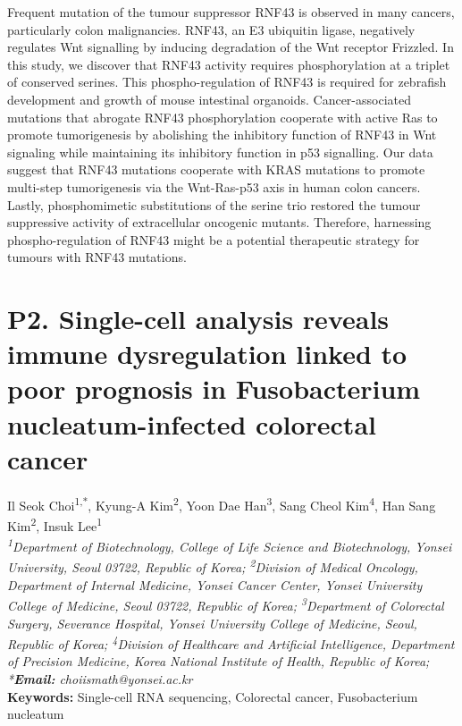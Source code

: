 \noindent
Frequent mutation of the tumour suppressor RNF43 is observed in many cancers, particularly colon malignancies. RNF43, an E3 ubiquitin ligase, negatively regulates Wnt signalling by inducing degradation of the Wnt receptor Frizzled. In this study, we discover that RNF43 activity requires phosphorylation at a triplet of conserved serines. This phospho-regulation of RNF43 is required for zebrafish development and growth of mouse intestinal organoids. Cancer-associated mutations that abrogate RNF43 phosphorylation cooperate with active Ras to promote tumorigenesis by abolishing the inhibitory function of RNF43 in Wnt signaling while maintaining its inhibitory function in p53 signalling. Our data suggest that RNF43 mutations cooperate with KRAS mutations to promote multi-step tumorigenesis via the Wnt-Ras-p53 axis in human colon cancers. Lastly, phosphomimetic substitutions of the serine trio restored the tumour suppressive activity of extracellular oncogenic mutants. Therefore, harnessing phospho-regulation of RNF43 might be a potential therapeutic strategy for tumours with RNF43 mutations.
\newpage

\section*{P2. Single-cell analysis reveals immune dysregulation linked to poor prognosis in Fusobacterium nucleatum-infected colorectal cancer}

\begin{center}
Il Seok Choi\textsuperscript{1,*}, Kyung-A Kim\textsuperscript{2}, Yoon Dae Han\textsuperscript{3}, Sang Cheol Kim\textsuperscript{4}, Han Sang Kim\textsuperscript{2}, Insuk Lee\textsuperscript{1} \\
\vspace{0.3cm}
\textit{\textsuperscript{1}Department of Biotechnology, College of Life Science and Biotechnology, Yonsei University, Seoul 03722, Republic of Korea; \textsuperscript{2}Division of Medical Oncology, Department of Internal Medicine, Yonsei Cancer Center, Yonsei University College of Medicine, Seoul 03722, Republic of Korea; \textsuperscript{3}Department of Colorectal Surgery, Severance Hospital, Yonsei University College of Medicine, Seoul, Republic of Korea; \textsuperscript{4}Division of Healthcare and Artificial Intelligence, Department of Precision Medicine, Korea National Institute of Health, Republic of Korea; *\textbf{Email:} choiismath@yonsei.ac.kr} \\
\vspace{0.3cm}
\textbf{Keywords:} Single-cell RNA sequencing, Colorectal cancer, Fusobacterium nucleatum
\end{center}

